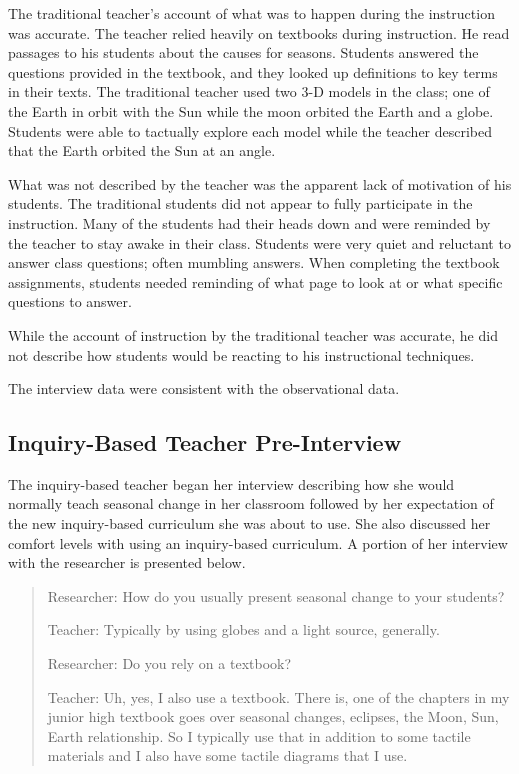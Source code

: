 \documentclass[11.5pt]{sig-alternate} %
\begin{document}
\begin{large}
The traditional teacher’s account of what was to happen during the instruction was accurate. The teacher relied heavily on textbooks during instruction. He read passages to his students about the causes for seasons. Students answered the questions provided in the textbook, and they looked up definitions to key terms in their texts. The traditional teacher used two 3-D models in the class; one of the Earth in orbit with the Sun while the moon orbited the Earth and a globe.  Students were able to tactually explore each model while the teacher described that the Earth orbited the Sun at an angle. 

What was not described by the teacher was the apparent lack of motivation of his students. The traditional students did not appear to fully participate in the instruction. Many of the students had their heads down and were reminded by the teacher to stay awake in their class. Students were very quiet and reluctant to answer class questions; often mumbling answers.  When completing the textbook assignments, students needed reminding of what page to look at or what specific questions to answer.  

While the account of instruction by the traditional teacher was accurate, he did not describe how students would be reacting to his instructional techniques. 

The interview data were consistent with the observational data. 

\subsection*{Inquiry-Based Teacher Pre-Interview}

The inquiry-based teacher began her interview describing how she would normally teach seasonal change in her classroom followed by her expectation of the new inquiry-based curriculum she was about to use.  She also discussed her comfort levels with using an inquiry-based curriculum. A portion of her interview with the researcher is presented below.

\begin{quote}
Researcher:  How do you usually present seasonal change to your students?

Teacher:  Typically by using globes and a light source, generally.

Researcher:  Do you rely on a textbook?

Teacher:  Uh, yes, I also use a textbook.  There is, one of the chapters in my junior high textbook goes over seasonal changes, eclipses, the Moon, Sun, Earth relationship.  So I typically use that in addition to some tactile materials and I also have some tactile diagrams that I use. 
 

\end{quote}
\end{large}
\end{document}
